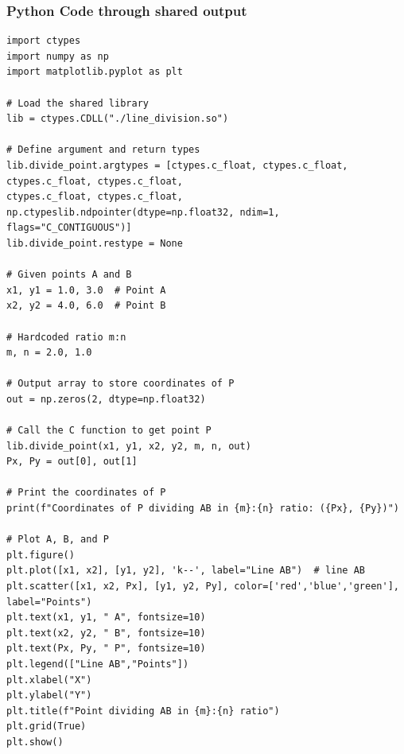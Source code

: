 \documentclass{beamer}
\begin{document}
\begin{frame}[fragile]
	\frametitle{Python Code through shared output}
	\begin{lstlisting}
import ctypes
import numpy as np
import matplotlib.pyplot as plt

# Load the shared library
lib = ctypes.CDLL("./line_division.so")

# Define argument and return types
lib.divide_point.argtypes = [ctypes.c_float, ctypes.c_float, ctypes.c_float, ctypes.c_float,
ctypes.c_float, ctypes.c_float,
np.ctypeslib.ndpointer(dtype=np.float32, ndim=1, flags="C_CONTIGUOUS")]
lib.divide_point.restype = None

# Given points A and B
x1, y1 = 1.0, 3.0  # Point A
x2, y2 = 4.0, 6.0  # Point B

# Hardcoded ratio m:n
m, n = 2.0, 1.0

# Output array to store coordinates of P
out = np.zeros(2, dtype=np.float32)

# Call the C function to get point P
lib.divide_point(x1, y1, x2, y2, m, n, out)
Px, Py = out[0], out[1]

# Print the coordinates of P
print(f"Coordinates of P dividing AB in {m}:{n} ratio: ({Px}, {Py})")

# Plot A, B, and P
plt.figure()
plt.plot([x1, x2], [y1, y2], 'k--', label="Line AB")  # line AB
plt.scatter([x1, x2, Px], [y1, y2, Py], color=['red','blue','green'], label="Points")
plt.text(x1, y1, " A", fontsize=10)
plt.text(x2, y2, " B", fontsize=10)
plt.text(Px, Py, " P", fontsize=10)
plt.legend(["Line AB","Points"])
plt.xlabel("X")
plt.ylabel("Y")
plt.title(f"Point dividing AB in {m}:{n} ratio")
plt.grid(True)
plt.show()
	\end{lstlisting}
\end{frame}
\end{document}
